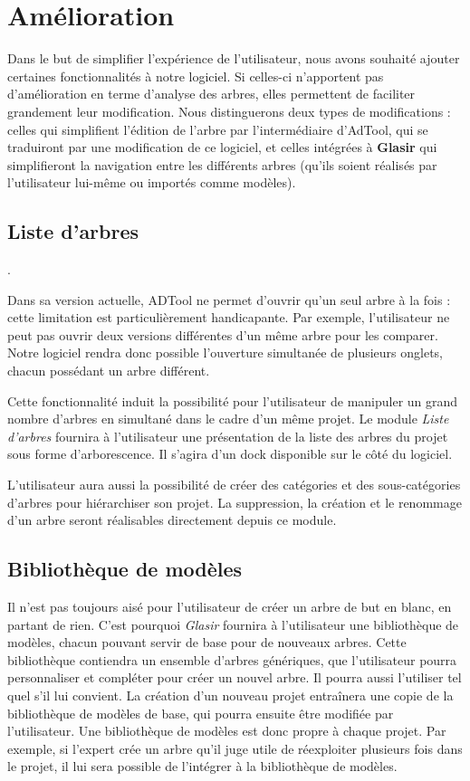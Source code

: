 \section{Amélioration}

	Dans le but de simplifier l'expérience de l'utilisateur, nous avons souhaité ajouter certaines fonctionnalités à notre logiciel. Si celles-ci n'apportent pas d'amélioration en terme d'analyse des arbres, elles permettent de faciliter grandement leur modification. Nous distinguerons deux types de modifications : celles qui simplifient l'édition de l'arbre par l’intermédiaire d'AdTool, qui se traduiront par une modification de ce logiciel, et celles intégrées à \textbf{Glasir} qui simplifieront la navigation entre les différents arbres (qu'ils soient réalisés par l'utilisateur lui-même ou importés comme modèles). 

	\subsection{Liste d'arbres}.

	Dans sa version actuelle, ADTool ne permet d'ouvrir qu'un seul arbre à la fois : cette limitation est particulièrement handicapante. Par exemple, l'utilisateur ne peut pas ouvrir deux versions différentes d'un même arbre pour les comparer. Notre logiciel rendra donc possible l'ouverture simultanée de plusieurs onglets, chacun possédant un arbre différent. 

	Cette fonctionnalité induit la possibilité pour l'utilisateur de manipuler un grand nombre d'arbres en simultané dans le cadre d'un même projet. Le module \emph{Liste d'arbres} fournira à l'utilisateur une présentation de la liste des arbres du projet sous forme d'arborescence. Il s'agira d'un dock disponible sur le côté du logiciel. 

	L'utilisateur aura aussi la possibilité de créer des catégories et des sous-catégories d'arbres pour hiérarchiser son projet. La suppression, la création et le renommage d'un arbre seront réalisables directement depuis ce module.
	
	\subsection{Bibliothèque de modèles}

	Il n'est pas toujours aisé pour l'utilisateur de créer un arbre de but en blanc, en partant de rien. C'est pourquoi \emph{Glasir} fournira à l'utilisateur une bibliothèque de modèles, chacun pouvant servir de base pour de nouveaux arbres. Cette bibliothèque contiendra un ensemble d'arbres génériques, que l'utilisateur pourra personnaliser et compléter pour créer un nouvel arbre. Il pourra aussi l'utiliser tel quel s'il lui convient. La création d'un nouveau projet entraînera une copie de la bibliothèque de modèles de base, qui pourra ensuite être modifiée par l'utilisateur. Une bibliothèque de modèles est donc propre à chaque projet. Par exemple, si l'expert crée un arbre qu'il juge utile de réexploiter plusieurs fois dans le projet, il lui sera possible de l'intégrer à la bibliothèque de modèles.

